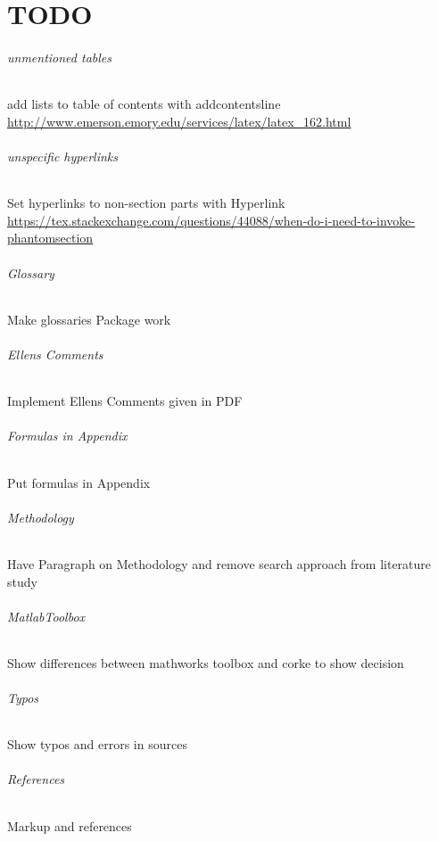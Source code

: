 \part{TODO}

\paragraph{unmentioned tables}
add lists to table of contents with addcontentsline
\url{http://www.emerson.emory.edu/services/latex/latex_162.html}

\paragraph{unspecific hyperlinks}
Set hyperlinks to non-section parts with Hyperlink
\url{https://tex.stackexchange.com/questions/44088/when-do-i-need-to-invoke-phantomsection}

\paragraph{Glossary}
Make glossaries Package work

\paragraph{Ellens Comments}
Implement Ellens Comments given in PDF

\paragraph{Formulas in Appendix}
Put formulas in Appendix

\paragraph{Methodology}
Have Paragraph on Methodology and remove search approach from literature study

\paragraph{MatlabToolbox}
Show differences between mathworks toolbox and corke to show decision

\paragraph{Typos}
Show typos and errors in sources

\paragraph{References}
Markup and references

